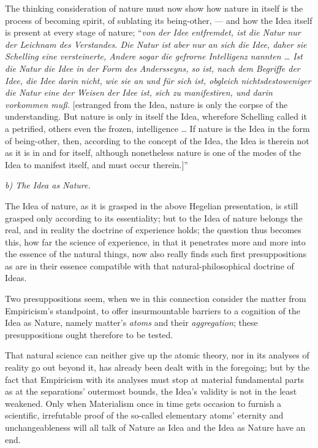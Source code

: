 \documentclass[12pt]{book}
\begin{document}
The thinking consideration of nature must now show how nature in itself is the process of becoming spirit,
of sublating its being-other, --- and how the Idea itself is present at every stage of nature; ``\textit{von
der Idee entfremdet, ist die Natur nur der Leichnam des Verstandes. Die Natur ist aber nur an sich die Idee,
daher sie Schelling eine versteinerte, Andere sogar die gefrorne Intelligenz nannten \ldots{} Ist die Natur
die Idee in der Form des Andersseyns, so ist, nach dem Begriffe der Idee, die Idee darin nicht, wie sie an
und für sich ist, obgleich nichtsdestoweniger die Natur eine der Weisen der Idee ist, sich zu manifestiren,
und darin vorkommen muß.} [estranged from the Idea, nature is only the corpse of the understanding. But
nature is only in itself the Idea, wherefore Schelling called it a petrified, others even the frozen,
intelligence \ldots{} If nature is the Idea in the form of being-other, then, according to the concept of the
Idea, the Idea is therein not as it is in and for itself, although nonetheless nature is one of the modes of
the Idea to manifest itself, and must occur therein.]''

\begin{center}\emph{b) The Idea as Nature.}\end{center}

The Idea of nature, as it is grasped in the above Hegelian presentation, is still grasped only according to
its
essentiality; but to the Idea of nature belongs the real, and in reality the doctrine of experience holds;
the question thus becomes this, how far the science of experience, in that it penetrates more and more into
the essence of the natural things, now also really finds such first presuppositions as are in their essence
compatible with that natural-philosophical doctrine of Ideas.

Two presuppositions seem, when we in this connection consider the matter from Empiricism's standpoint, to
offer insurmountable barriers to a cognition of the Idea as Nature, namely matter's \emph{atoms} and their
\emph{aggregation}; these presuppositions ought therefore to be tested.

That natural science can neither give up the atomic theory, nor in its analyses of reality go out beyond it,
has already been dealt with in the foregoing; but by the fact that Empiricism with its analyses must stop at
material fundamental parts as at the separations' outermost bounds, the Idea's validity is not in the least
weakened. Only when Materialism once in time gets occasion to furnish a scientific, irrefutable proof of the
so-called elementary atoms' eternity and unchangeableness will all talk of Nature as Idea and the Idea as
Nature have an end.
\end{document}
